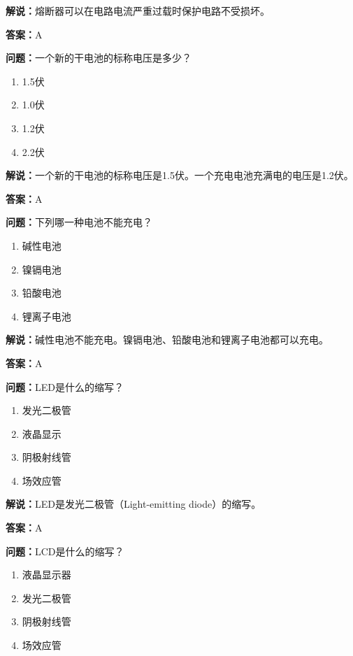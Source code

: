 \documentclass[UTF8]{ctexbook}
\begin{document}
\textbf{解说：}熔断器可以在电路电流严重过载时保护电路不受损坏。%

\textbf{答案：}A

\textbf{问题：}一个新的干电池的标称电压是多少？

\begin{enumerate}[label=\Alph*), leftmargin=3em]
  \item 1.5伏
  \item 1.0伏
  \item 1.2伏
  \item 2.2伏
\end{enumerate}

\textbf{解说：}一个新的干电池的标称电压是1.5伏。一个充电电池充满电的电压是1.2伏。%

\textbf{答案：}A

\textbf{问题：}下列哪一种电池不能充电？

\begin{enumerate}[label=\Alph*), leftmargin=3em]
  \item 碱性电池
  \item 镍镉电池
  \item 铅酸电池
  \item 锂离子电池
\end{enumerate}

\textbf{解说：}碱性电池不能充电。镍镉电池、铅酸电池和锂离子电池都可以充电。%

\textbf{答案：}A

\textbf{问题：}LED是什么的缩写？

\begin{enumerate}[label=\Alph*), leftmargin=3em]
  \item 发光二极管
  \item 液晶显示
  \item 阴极射线管
  \item 场效应管
\end{enumerate}

\textbf{解说：}LED是发光二极管（Light-emitting diode）的缩写。%

\textbf{答案：}A

\textbf{问题：}LCD是什么的缩写？

\begin{enumerate}[label=\Alph*), leftmargin=3em]
  \item 液晶显示器
  \item 发光二极管
  \item 阴极射线管
  \item 场效应管
\end{enumerate}
\end{document}

